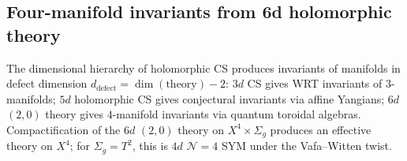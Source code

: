 
\subsection{Four-manifold invariants from 6d holomorphic theory}
\label{subsec:four-manifold-6d}

The dimensional hierarchy of holomorphic CS produces invariants of
manifolds in defect dimension $d_{\mathrm{defect}} = \dim(\text{theory}) - 2$:
$3d$ CS gives WRT invariants of $3$-manifolds; $5d$ holomorphic CS gives
conjectural invariants via affine Yangians; $6d$ $(2,0)$ theory gives
$4$-manifold invariants via quantum toroidal algebras. Compactification
of the $6d$ $(2,0)$ theory on $X^4 \times \Sigma_g$ produces an effective
theory on $X^4$; for $\Sigma_g = T^2$, this is $4d$ $\mathcal{N} = 4$
SYM under the Vafa--Witten twist.

